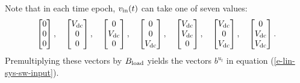 \documentclass[12pt]{article}
\begin{document}
Note that in each time epoch,
$v_{\rm in}(t)$ can take one of seven values:
\[
\begin{bmatrix} 0 \\ 0 \\ 0 \end{bmatrix},
\quad
\begin{bmatrix} V_{\rm dc} \\ 0 \\ 0 \end{bmatrix},
\quad
\begin{bmatrix} 0 \\ V_{\rm dc} \\ 0 \end{bmatrix},
\quad
\begin{bmatrix} 0 \\ 0 \\ V_{\rm dc} \end{bmatrix},
\quad
\begin{bmatrix} V_{\rm dc} \\ V_{\rm dc} \\ 0 \end{bmatrix},
\quad
\begin{bmatrix} V_{\rm dc} \\ 0 \\ V_{\rm dc} \end{bmatrix},
\quad
\begin{bmatrix} 0 \\ V_{\rm dc} \\ V_{\rm dc} \end{bmatrix}.
\]
Premultiplying these vectors by $B_{\rm load}$ yields
the vectors $b^{u_t}$ in equation 
(\ref{e-lin-sys-sw-input}).
\end{document}
